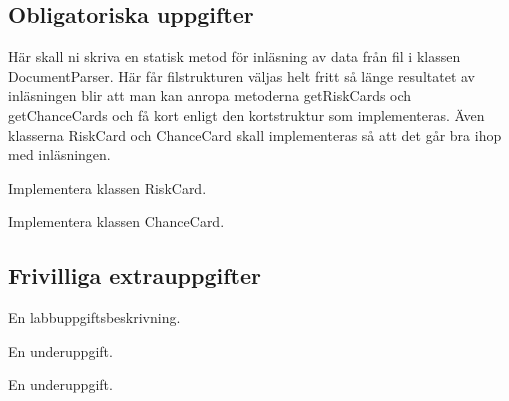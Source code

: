 \subsection{Obligatoriska uppgifter}


\Task Här skall ni skriva en statisk metod för inläsning av data från fil i klassen DocumentParser. Här får filstrukturen väljas helt fritt så länge resultatet av inläsningen blir att man kan anropa metoderna getRiskCards och getChanceCards och få kort enligt den kortstruktur som implementeras. Även klasserna RiskCard och ChanceCard skall implementeras så att det går bra ihop med inläsningen.

\Subtask Implementera klassen RiskCard.

\Subtask Implementera klassen ChanceCard.

\Task 

\subsection{Frivilliga extrauppgifter}

\Task En labbuppgiftsbeskrivning.

\Subtask En underuppgift.

\Subtask En underuppgift.
    